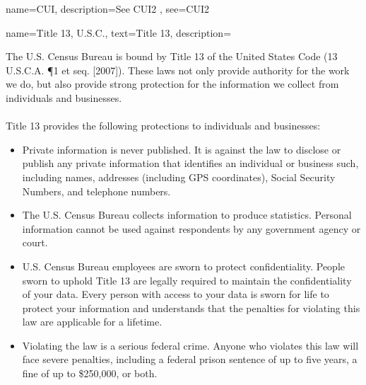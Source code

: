 {
    name=CUI,
    description={See  \gls{CUI2}    },
    see={CUI2}
}

{
name={Title 13, U.S.C.},
text=Title 13,
description={The U.S. Census Bureau is bound by Title 13 of the United States Code (13 U.S.C.A. \P 1 et seq. [2007]). These laws not only provide authority for the work we do, but also provide strong protection for the information we collect from individuals and businesses.\\
\\
Title 13 provides the following protections to individuals and businesses:
\begin{itemize}
\item     Private information is never published. It is against the law to disclose or publish any private information that identifies an individual or business such, including names, addresses (including GPS coordinates), Social Security Numbers, and telephone numbers.
\item     The U.S. Census Bureau collects information to produce statistics. Personal information cannot be used against respondents by any government agency or court.
\item   U.S. Census Bureau employees are sworn to protect confidentiality. People sworn to uphold Title 13 are legally required to maintain the confidentiality of your data. Every person with access to your data is sworn for life to protect your information and understands that the penalties for violating this law are applicable for a lifetime.
\item    Violating the law is a serious federal crime. Anyone who violates this law will face severe penalties, including a federal prison sentence of up to five years, a fine of up to \$250,000, or both.
\end{itemize} \parencite{us_code_title_1954}
}
}

